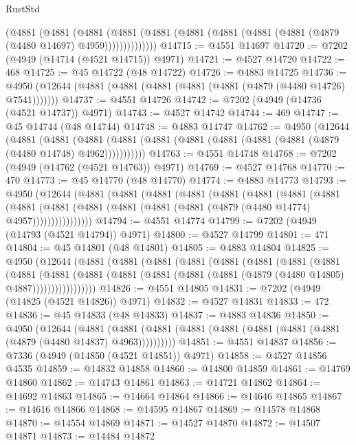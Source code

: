 \begin{lexlean}{RustStd}
\begin{coremodule}
            (@4881
              (@4881
                (@4881
                  (@4881
                    (@4881 (@4881 (@4881 (@4881 (@4881 (@4879 (@4480 @14697) @4959))))))))))))))
@14715 := @4551 @14697
@14720 := @7202 (@4949 (@14714 (@4521 @14715)) @4971)
@14721 := @4527 @14720
@14722 := 468
@14725 := @45 @14722 (@48 @14722)
@14726 := @4883 @14725
@14736 := @4950 (@12644 (@4881 (@4881 (@4881 (@4881 (@4881 (@4879 (@4480 @14726) @7541)))))))
@14737 := @4551 @14726
@14742 := @7202 (@4949 (@14736 (@4521 @14737)) @4971)
@14743 := @4527 @14742
@14744 := 469
@14747 := @45 @14744 (@48 @14744)
@14748 := @4883 @14747
@14762 := @4950
    (@12644
      (@4881
        (@4881
          (@4881 (@4881 (@4881 (@4881 (@4881 (@4881 (@4881 (@4879 (@4480 @14748) @4962)))))))))))
@14763 := @4551 @14748
@14768 := @7202 (@4949 (@14762 (@4521 @14763)) @4971)
@14769 := @4527 @14768
@14770 := 470
@14773 := @45 @14770 (@48 @14770)
@14774 := @4883 @14773
@14793 := @4950
    (@12644
      (@4881
        (@4881
          (@4881
            (@4881
              (@4881
                (@4881
                  (@4881
                    (@4881
                      (@4881
                        (@4881
                          (@4881 (@4881 (@4881 (@4881 (@4879 (@4480 @14774) @4957))))))))))))))))
@14794 := @4551 @14774
@14799 := @7202 (@4949 (@14793 (@4521 @14794)) @4971)
@14800 := @4527 @14799
@14801 := 471
@14804 := @45 @14801 (@48 @14801)
@14805 := @4883 @14804
@14825 := @4950
    (@12644
      (@4881
        (@4881
          (@4881
            (@4881
              (@4881
                (@4881
                  (@4881
                    (@4881
                      (@4881
                        (@4881
                          (@4881
                            (@4881 (@4881 (@4881 (@4881 (@4879 (@4480 @14805) @4887)))))))))))))))))
@14826 := @4551 @14805
@14831 := @7202 (@4949 (@14825 (@4521 @14826)) @4971)
@14832 := @4527 @14831
@14833 := 472
@14836 := @45 @14833 (@48 @14833)
@14837 := @4883 @14836
@14850 := @4950
    (@12644
      (@4881 (@4881 (@4881 (@4881 (@4881 (@4881 (@4881 (@4881 (@4879 (@4480 @14837) @4963))))))))))
@14851 := @4551 @14837
@14856 := @7336 (@4949 (@14850 (@4521 @14851)) @4971)
@14858 := @4527 @14856 @4535
@14859 := @14832 @14858
@14860 := @14800 @14859
@14861 := @14769 @14860
@14862 := @14743 @14861
@14863 := @14721 @14862
@14864 := @14692 @14863
@14865 := @14664 @14864
@14866 := @14646 @14865
@14867 := @14616 @14866
@14868 := @14595 @14867
@14869 := @14578 @14868
@14870 := @14554 @14869
@14871 := @14527 @14870
@14872 := @14507 @14871
@14873 := @14484 @14872

\end{coremodule}
\end{lexlean}
